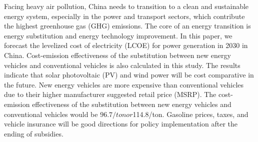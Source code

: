 Facing heavy air pollution, China needs to transition to a clean and sustainable energy system, especially in the power and transport sectors, which contribute the highest greenhouse gas (GHG) emissions. The core of an energy transition is energy substitution and energy technology improvement. In this paper, we forecast the levelized cost of electricity (LCOE) for power generation in 2030 in China. Cost-emission effectiveness of the substitution between new energy vehicles and conventional vehicles is also calculated in this study. The results indicate that solar photovoltaic (PV) and wind power will be cost comparative in the future. New energy vehicles are more expensive than conventional vehicles due to their higher manufacturer suggested retail price (MSRP). The cost-emission effectiveness of the substitution between new energy vehicles and conventional vehicles would be $96.7/ton or $114.8/ton. Gasoline prices, taxes, and vehicle insurance will be good directions for policy implementation after the ending of subsidies.